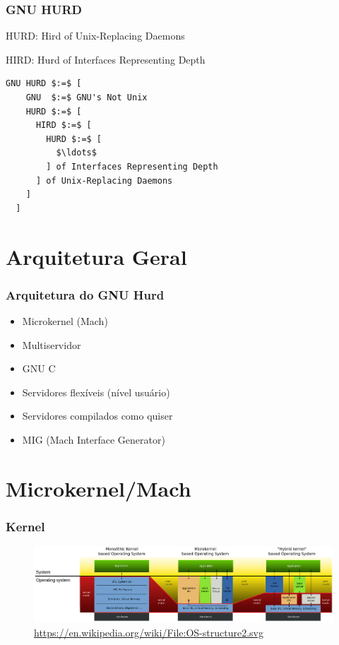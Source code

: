 \documentclass[10pt]{beamer}
\theoremstyle{plain}
\begin{document}
\begin{frame}[fragile]
  \frametitle{GNU HURD}

  HURD\@: Hird of Unix-Replacing Daemons

  HIRD\@: Hurd of Interfaces Representing Depth

  \begin{lstlisting}[mathescape=true,showstringspaces=false,numbers=none,frame=single]
  GNU HURD $:=$ [
    GNU  $:=$ GNU's Not Unix
    HURD $:=$ [
      HIRD $:=$ [
        HURD $:=$ [
          $\ldots$
        ] of Interfaces Representing Depth
      ] of Unix-Replacing Daemons
    ]
  ]
  \end{lstlisting}

\end{frame}

\section{Arquitetura Geral}

\begin{frame}
  \frametitle{Arquitetura do GNU Hurd}

  \begin{itemize}
    \item Microkernel (Mach)
    \item Multiservidor
    \item GNU C
    \item Servidores flexíveis (nível usuário)
    \item Servidores compilados como quiser
    \item MIG (Mach Interface Generator)
  \end{itemize}
\end{frame}

\section{Microkernel/Mach}

\begin{frame}
  \frametitle{Kernel}
  \begin{figure}[h]
    \hspace*{-0.9cm}
    \includegraphics[scale=0.235]{imgs/kernel.png}
    \caption{\url{https://en.wikipedia.org/wiki/File:OS-structure2.svg}}
  \end{figure}
\end{frame}
\end{document}
